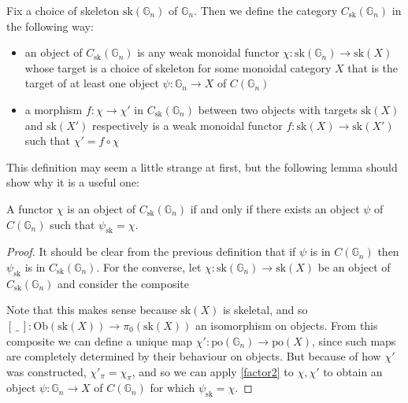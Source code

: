 \begin{defn} Fix a choice of skeleton $\mathrm{sk}(\mathbb{G}_n)$ of $\mathbb{G}_n$. Then we define the category $C_{\mathrm{sk}}(\mathbb{G}_n)$ in the following way:
\begin{itemize}
\item an object of $C_{\mathrm{sk}}(\mathbb{G}_n)$ is any weak monoidal functor $\chi: \mathrm{sk}(\mathbb{G}_n) \to \mathrm{sk}(X)$ whose target is a choice of skeleton for some monoidal category $X$ that is the target of at least one object $\psi: \mathbb{G}_n \to X$ of $C(\mathbb{G}_n)$
\item a morphism $f: \chi \to \chi'$ in $C_{\mathrm{sk}}(\mathbb{G}_n)$ between two objects with targets $\mathrm{sk}(X)$ and $\mathrm{sk}(X')$ respectively is a weak monoidal functor $f: \mathrm{sk}(X) \to \mathrm{sk}(X')$ such that $\chi' = f \circ \chi$
\end{itemize}
\end{defn}

This definition may seem a little strange at first, but the following lemma should show why it is a useful one:

\begin{lem}\label{Csklem} A functor $\chi$ is an object of $C_{\mathrm{sk}}(\mathbb{G}_n)$ if and only if there exists an object $\psi$ of $C(\mathbb{G}_n)$ such that $\psi_{\mathrm{sk}} = \chi$.
\end{lem}
\begin{proof}
It should be clear from the previous definition that if $\psi$ is in $C(\mathbb{G}_n)$ then $\psi_{\mathrm{sk}}$ is in $C_{\mathrm{sk}}(\mathbb{G}_n)$. For the converse, let $\chi: \mathrm{sk}(\mathbb{G}_n) \to \mathrm{sk}(X)$ be an object of $C_{\mathrm{sk}}(\mathbb{G}_n)$ and consider the composite
\begin{eq*}  \end{eq*}
Note that this makes sense because $\mathrm{sk}(X)$ is skeletal, and so $[ \, \_ \, ] : \mathrm{Ob}(\mathrm{sk}(X)) \to \pi_0(\mathrm{sk}(X))$ an isomorphism on objects. From this composite we can define a unique map $\chi': \mathrm{po}(\mathbb{G}_n) \to \mathrm{po}(X)$, since such maps are completely determined by their behaviour on objects. But because of how $\chi'$ was constructed, $\chi'_{\pi} = \chi_{\pi}$, and so we can apply \cref{factor2} to $\chi, \chi'$ to obtain an object $\psi : \mathbb{G}_n \to X$ of $C(\mathbb{G}_n)$ for which $\psi_{\mathrm{sk}} = \chi$.
\end{proof}

